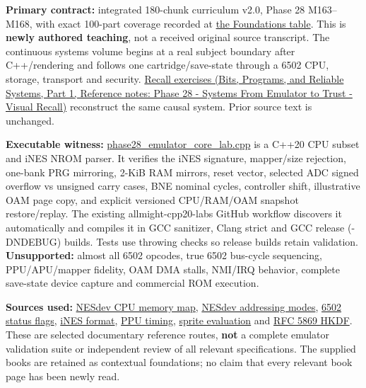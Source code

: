 \hypertarget{appendix-a103e7846d21-phase-28-reconstructed-original-parts-27012800-emulator-bytes-to-verified-trust-boundaries}{}

\textbf{Primary contract:} integrated 180-chunk curriculum v2.0, Phase 28 M163--M168, with exact 100-part coverage recorded at \hyperref[appendix-fd090d982a15-phase-28-m163m168-parts-27012800-deterministic-and-trusted-low-level-systems]{the Foundations table}. This is \textbf{newly authored teaching}, not a received original source transcript. {The continuous systems volume} begins at a real subject boundary after C++/rendering and follows one cartridge/save-state through a 6502 CPU, storage, transport and security. \href{../01-Bits-Programs-and-Reliable-Systems-P01/main.pdf\#nameddest=appendix-11f73b337e37}{Recall exercises (Bits, Programs, and Reliable Systems, Part 1, Reference notes: Phase 28 - Systems From Emulator to Trust - Visual Recall)} reconstruct the same causal system. Prior source text is unchanged.

\textbf{Executable witness:} \hyperref[source-file-552a9e2296dc984412c8f06d]{phase28\_emulator\_core\_lab.cpp} is a C++20 CPU subset and iNES NROM parser. It verifies the iNES signature, mapper/size rejection, one-bank PRG mirroring, 2-KiB RAM mirrors, reset vector, selected ADC signed overflow vs unsigned carry cases, BNE nominal cycles, controller shift, illustrative OAM page copy, and explicit versioned CPU/RAM/OAM snapshot restore/replay. The existing allmight-cpp20-labs GitHub workflow discovers it automatically and compiles it in GCC sanitizer, Clang strict and GCC release (-DNDEBUG) builds. Tests use throwing checks so release builds retain validation. \textbf{Unsupported:} almost all 6502 opcodes, true 6502 bus-cycle sequencing, PPU/APU/mapper fidelity, OAM DMA stalls, NMI/IRQ behavior, complete save-state device capture and commercial ROM execution.

\textbf{Sources used:} \href{https://www.nesdev.org/wiki/CPU_memory_map}{NESdev CPU memory map}, \href{https://www.nesdev.org/wiki/Addressing_modes}{NESdev addressing modes}, \href{https://www.nesdev.org/wiki/Status_flag}{6502 status flags}, \href{https://www.nesdev.org/wiki/INES}{iNES format}, \href{https://www.nesdev.org/wiki/PPU_frame_timing}{PPU timing}, \href{https://www.nesdev.org/wiki/PPU_sprite_evaluation}{sprite evaluation} and \href{https://www.rfc-editor.org/rfc/rfc5869.html}{RFC 5869 HKDF}. These are selected documentary reference routes, \textbf{not} a complete emulator validation suite or independent review of all relevant specifications. The supplied books are retained as contextual foundations; no claim that every relevant book page has been newly read.

